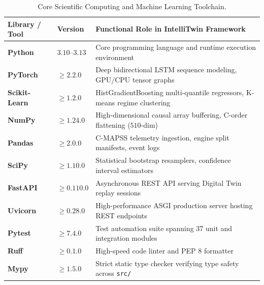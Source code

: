 \documentclass[12pt,a4paper]{article}
\begin{document}
\begin{table}[htbp]
\centering
\caption{Core Scientific Computing and Machine Learning Toolchain.}
\label{tab:toolchain}
\small
\begin{tabularx}{\textwidth}{llX}
\toprule
\textbf{Library / Tool} & \textbf{Version} & \textbf{Functional Role in IntelliTwin Framework} \\
\midrule
\textbf{Python} & $3.10$--$3.13$ & Core programming language and runtime execution environment \\
\textbf{PyTorch} & $\ge 2.2.0$ & Deep bidirectional LSTM sequence modeling, GPU/CPU tensor graphs \\
\textbf{Scikit-Learn} & $\ge 1.2.0$ & HistGradientBoosting multi-quantile regressors, K-means regime clustering \\
\textbf{NumPy} & $\ge 1.24.0$ & High-dimensional causal array buffering, C-order flattening ($510$-dim) \\
\textbf{Pandas} & $\ge 2.0.0$ & C-MAPSS telemetry ingestion, engine split manifests, event logs \\
\textbf{SciPy} & $\ge 1.10.0$ & Statistical bootstrap resamplers, confidence interval estimators \\
\textbf{FastAPI} & $\ge 0.110.0$ & Asynchronous REST API serving Digital Twin replay sessions \\
\textbf{Uvicorn} & $\ge 0.28.0$ & High-performance ASGI production server hosting REST endpoints \\
\textbf{Pytest} & $\ge 7.4.0$ & Test automation suite spanning 37 unit and integration modules \\
\textbf{Ruff} & $\ge 0.1.0$ & High-speed code linter and PEP 8 formatter \\
\textbf{Mypy} & $\ge 1.5.0$ & Strict static type checker verifying type safety across \texttt{src/} \\
\bottomrule
\end{tabularx}
\end{table}
\end{document}
